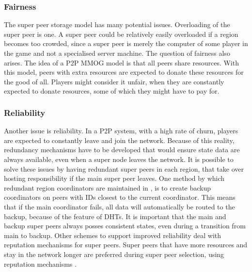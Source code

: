 \documentclass[10pt,a4paper,journal,cspaper,compsoc]{IEEEtran}
\begin{document}
\subsubsection{Fairness}
The super peer storage model has many potential issues. Overloading of the super peer is one. A super peer could be relatively easily overloaded if a
region becomes too crowded, since a super peer is merely the computer of some player in the game and not a specialised server machine. The question
of fairness also arises. The idea of a P2P MMOG model is that all peers share resources. With this model, peers with extra resources are expected to
donate these resources for the good of all. Players might consider it unfair, when they are constantly expected to donate resources, some of which
they might have to pay for.

\subsubsection{Reliability}
Another issue is reliability. In a P2P system, with a high rate of churn, players are expected to constantly leave and join the network. Because of
this reality, redundancy mechanisms have to be developed that would ensure state data are always available, even when a super node leaves the
network. It is possible to solve these issues by having redundant super peers in each region, that take over hosting responsibility if the main super
peer leaves. One method by which redundant region coordinators are maintained in \cite{knutsson_p2p_first}, is to create backup coordinators on peers
with IDs closest to the current coordinator. This means that if the main coordinator fails, all data will automatically be routed to the backup,
because of the feature of DHTs. It is important that the main and backup super peers always posses consistent states, even during a transition from
main to backup. Other schemes to support improved reliability deal with reputation mechanisms for super peers. Super peers that have more resources
and stay in the network longer are preferred during super peer selection, using reputation mechanisms \cite{fan_mediator_paper}.
\end{document}
